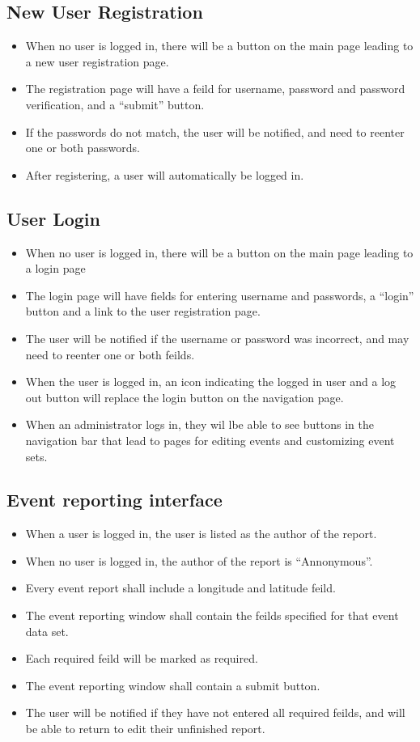 \subsection{New User Registration}
\begin{itemize}
\item When no user is logged in, there will be a button on the main page leading to a new user registration page.
\item The registration page will have a feild for username, password and password verification, and a ``submit'' button.
\item If the passwords do not match, the user will be notified, and need to reenter one or both passwords.
\item After registering, a user will automatically be logged in.
\end{itemize}

\subsection{User Login}
\begin{itemize}
\item When no user is logged in, there will be a button on the main page leading to a login page
\item The login page will have fields for entering username and passwords, a ``login'' button and a link to the user registration page.
\item The user will be notified if the username or password was incorrect, and may need to reenter one or both feilds.
\item When the user is logged in, an icon indicating the logged in user and a log out button will replace the login button on the navigation page.
\item When an administrator logs in, they wil lbe able to see buttons in the navigation bar that lead to pages for editing events and customizing event sets.
\end{itemize}

\subsection{Event reporting interface}
\begin{itemize}
\item When a user is logged in, the user is listed as the author of the report.
\item When no user is logged in, the author of the report is ``Annonymous''.
\item Every event report shall include a longitude and latitude feild.
\item The event reporting window shall contain the feilds specified for that event data set.
\item Each required feild will be marked as required.
\item The event reporting window shall contain a submit button.
\item The user will be notified if they have not entered all required feilds, and will be able to return to edit their unfinished report.
\end{itemize}

